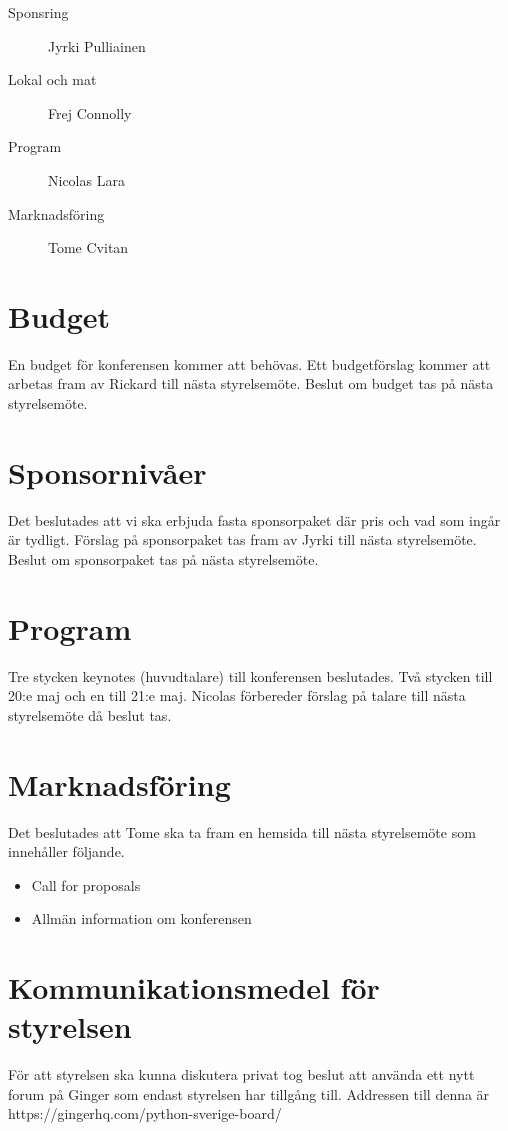 \documentclass[11pt, a4paper]{article}
\begin{document}
\begin{description}
    \item[Sponsring] Jyrki Pulliainen
    \item[Lokal och mat] Frej Connolly
    \item[Program] Nicolas Lara
    \item[Marknadsföring] Tome Cvitan
\end{description}

\section{Budget}
En budget för konferensen kommer att behövas. Ett budgetförslag kommer att
arbetas fram av Rickard till nästa styrelsemöte. Beslut om budget tas på nästa
styrelsemöte.

\section{Sponsornivåer}
Det beslutades att vi ska erbjuda fasta sponsorpaket där pris och vad som ingår
är tydligt. Förslag på sponsorpaket tas fram av Jyrki till nästa styrelsemöte.
Beslut om sponsorpaket tas på nästa styrelsemöte.

\section{Program}
Tre stycken keynotes (huvudtalare) till konferensen beslutades. Två stycken
till 20:e maj och en till 21:e maj. Nicolas förbereder förslag på talare till
nästa styrelsemöte då beslut tas.

\section{Marknadsföring}
Det beslutades att Tome ska ta fram en hemsida till nästa styrelsemöte som
innehåller följande.

\begin{itemize}
    \item Call for proposals
    \item Allmän information om konferensen
\end{itemize}

\section{Kommunikationsmedel för styrelsen}
För att styrelsen ska kunna diskutera privat tog beslut att använda ett nytt
forum på Ginger som endast styrelsen har tillgång till. Addressen till denna är
https://gingerhq.com/python-sverige-board/
\end{document}
